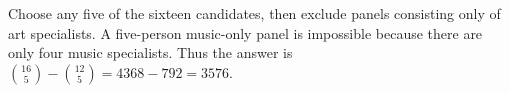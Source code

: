 Choose any five of the sixteen candidates, then exclude panels consisting only of art specialists. A five-person music-only panel is impossible because there are only four music specialists. Thus the answer is $\binom{16}{5}-\binom{12}{5}=4368-792=\boxed{3576}$.
